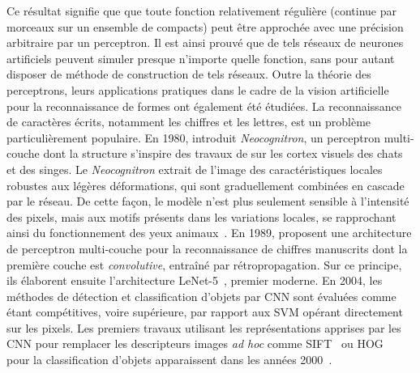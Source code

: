 Ce résultat signifie que que toute fonction relativement régulière (continue par morceaux sur un ensemble de compacts) peut être approchée avec une précision arbitraire par un perceptron. Il est ainsi prouvé que de tels réseaux de neurones artificiels peuvent simuler presque n'importe quelle fonction, sans pour autant disposer de méthode de construction de tels réseaux. Outre la théorie des perceptrons, leurs applications pratiques dans le cadre de la vision artificielle pour la reconnaissance de formes ont également été étudiées. La reconnaissance de caractères écrits, notamment les chiffres et les lettres, est un problème particulièrement populaire. En 1980, \citet{fukushima_neocognitron_1980} introduit \emph{Neocognitron}, un perceptron multi-couche dont la structure s'inspire des travaux de \citet{hubel_receptive_1959,hubel_receptive_1968} sur les cortex visuels des chats et des singes. Le \emph{Neocognitron} extrait de l'image des caractéristiques locales robustes aux légères déformations, qui sont graduellement combinées en cascade par le réseau. De cette façon, le modèle n'est plus seulement sensible à l'intensité des pixels, mais aux motifs présents dans les variations locales, se rapprochant ainsi du fonctionnement des yeux animaux~\cite{lettvin_what_1959}. En 1989, \citet{lecun_backpropagation_1989} proposent une architecture de perceptron multi-couche pour la reconnaissance de chiffres manuscrits dont la première couche est \emph{convolutive}, entraîné par rétropropagation. Sur ce principe, ils élaborent ensuite l'architecture LeNet-5~\cite{lecun_gradient-based_1998}, premier  moderne. En 2004, les méthodes de détection et classification d'objets par \gls{CNN} sont évaluées comme étant compétitives, voire supérieure, par rapport aux \gls{SVM} opérant directement sur les pixels. Les premiers travaux utilisant les représentations apprises par les \gls{CNN} pour remplacer les descripteurs images \emph{ad hoc} comme \gls{SIFT}~\cite{lowe_object_1999} ou \gls{HOG}~\cite{dalal_histograms_2005} pour la classification d'objets apparaissent dans les années 2000~\cite{serre_object_2005,huang_large-scale_2006}.


